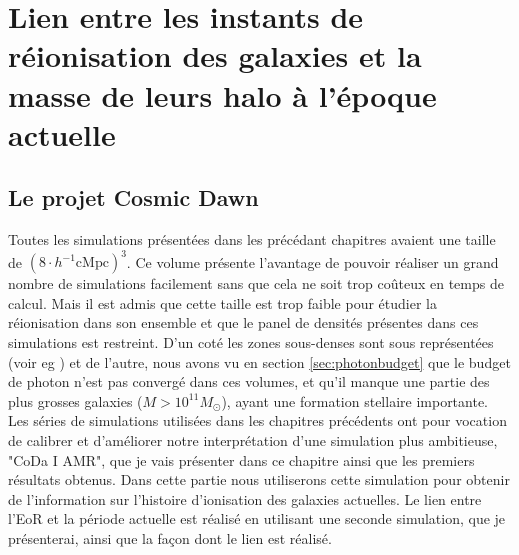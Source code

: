 \chapter{Lien entre les instants de réionisation des galaxies et la masse de leurs halo à l'époque actuelle}
\label{sec:z0}

\section{Le projet Cosmic Dawn}
\label{sec:CODAEMMA}

Toutes les simulations présentées dans les précédant chapitres avaient une taille de $\left( 8\cdot h^{-1} \mathrm{cMpc} \right)^3$.
Ce volume présente l'avantage de pouvoir réaliser un grand nombre de simulations facilement sans que cela ne soit trop coûteux en temps de calcul.
Mais il est admis que cette taille est trop faible pour étudier la réionisation dans son ensemble et que le panel de densités présentes dans ces simulations est restreint.
D'un coté les zones sous-denses sont sous représentées  (voir eg \cite{iliev_simulating_2006}) et de l'autre, nous avons vu en section \ref{sec:photonbudget} que le budget de photon n'est pas convergé dans ces volumes, et qu'il manque une partie des plus grosses galaxies ($M>10^{11}M_\odot$), ayant une formation stellaire importante.
Les séries de simulations utilisées dans les chapitres précédents ont pour vocation de calibrer et d'améliorer notre interprétation d'une simulation plus ambitieuse, "\ac{CoDa} I AMR", que je vais présenter dans ce chapitre ainsi que les premiers résultats obtenus.
Dans cette partie nous utiliserons cette simulation pour obtenir de l'information sur l'histoire d'ionisation des galaxies actuelles.
Le lien entre l'\ac{EoR} et la période actuelle est réalisé en utilisant une seconde simulation, que je présenterai, ainsi que la façon dont le lien est réalisé.



